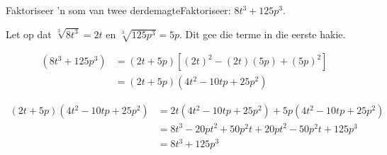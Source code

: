 \begin{wex}{Faktoriseer 'n som van twee derdemagte}{Faktoriseer: $8t^{3} +125p^{3}$.}
{

Let op dat $\sqrt[3]{8t^{3}} = 2t$ en $\sqrt[3]{125p^{3}} = 5p$. Dit gee die terme in die eerste hakie.
\newline

\begin{align*}
  (8t^{3} +125p^{3}) &= (2t + 5p)\left[(2t)^{2} - (2t)(5p)+(5p)^{2}\right] \\
                     &= (2t+5p)(4t^{2} - 10tp + 25p^{2})
\end{align*}

\begin{align*}
  (2t+5p)(4t^{2} - 10tp + 25p^{2}) &= 2t(4t^{2} - 10tp + 25p^{2})+5p(4t^{2} - 10tp + 25p^{2})\\
		   &= 8t^{3} - 20pt^{2} + 50p^{2}t+ 20pt^{2} - 50p^{2}t + 125p^{3}\\
		   &= 8t^{3} +125p^{3}\\
\end{align*}
\vspace*{-50pt}}
\end{wex}


